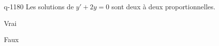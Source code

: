 \begin{truefalse}{q-1180}
Les solutions de $y'+2y=0$ sont deux à deux proportionnelles.
\item* Vrai
\item Faux
\end{truefalse}

